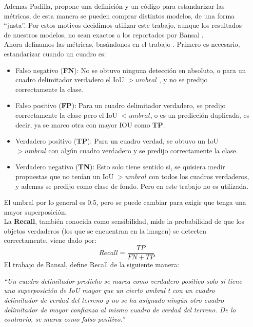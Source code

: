 Ademas Padilla, propone una definición y un código para estandarizar las métricas, de esta manera se pueden comprar distintos modelos, de una forma ``justa''. Por estos motivos decidimos utilizar este trabajo, aunque los resultados de nuestros modelos, no sean exactos a los reportados por Bansal \cite{bansal2018zero}.\\

Ahora definamos las métricas, basándonos en el trabajo \cite{padilla2020survey}. Primero es necesario, estandarizar cuando un cuadro es:
\begin{itemize}
	\item Falso negativo (\textbf{FN}): No se obtuvo ninguna detección en absoluto, o para un cuadro delimitador verdadero el IoU $> umbral$ , y no se predijo correctamente la clase.
	\item Falso positivo (\textbf{FP}): Para un cuadro delimitador verdadero, se predijo correctamente la clase pero el IoU $< umbral$, o es un predicción duplicada, es decir, ya se marco otra con mayor IOU como \textbf{TP}.
	\item Verdadero positivo (\textbf{TP}): Para un cuadro verdad, se obtuvo un IoU $> umbral$ con algún cuadro verdadero y se predijo correctamente la clase.
	\item Verdadero negativo (\textbf{TN}): Esto solo tiene sentido si, se quisiera medir propuestas que no tenían un IoU $> umbral$ con todos los cuadros verdaderos, y ademas se predijo como clase de fondo. Pero en este trabajo no es utilizada.
\end{itemize}
El umbral por lo general es 0.5, pero se puede cambiar para exigir que tenga una mayor superposición.\\


La \textbf{Recall}, también conocida como sensibilidad, mide la probabilidad de que los objetos verdaderos (los que se encuentran en la imagen) se detecten correctamente, viene dado por: \[Recall =\frac{TP}{FN+TP}\] El trabajo de Bansal, define Recall de la siguiente manera: 
\begin{center}
	\textit{``Un cuadro delimitador predicho se marca como verdadero positivo solo si tiene una superposición de IoU mayor que un cierto umbral t con un cuadro delimitador de verdad del terreno y no se ha asignado ningún otro cuadro delimitador de mayor confianza al mismo cuadro de verdad del terreno. De lo contrario, se marca como falso positivo.''}\\
\end{center}

